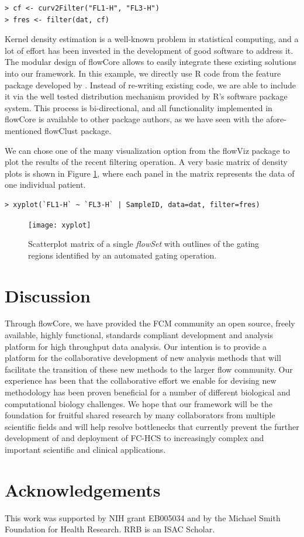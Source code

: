 \documentclass[12pt]{article}
\newcommand{\Rpackage}[1]{{\textsf{#1}}}
\newcommand{\Rclass}[1]{{\textit{#1}}}
\begin{document}
\begin{verbatim}
> cf <- curv2Filter("FL1-H", "FL3-H")
> fres <- filter(dat, cf)
\end{verbatim}

Kernel density estimation is a well-known problem in statistical
computing, and a lot of effort has been invested in the development of
good software to address it. The modular design of \Rpackage{flowCore}
allows to easily integrate these existing solutions into our
framework. In this example, we directly use R code from the
\Rpackage{feature} package developed by \cite{wand2008}. Instead of
re-writing existing code, we are able to include it via the well
tested distribution mechanism provided by R's software package
system. This process is bi-directional, and all functionality
implemented in \Rpackage{flowCore} is available to other package
authors, as we have seen with the afore-mentioned \Rpackage{flowClust}
package.

We can chose one of the many visualization option from the flowViz
package to plot the results of the recent filtering operation. A very
basic matrix of density plots is shown in Figure \ref{xyplot}, where
each panel in the matrix represents the data of one individual
patient.

\begin{verbatim}
> xyplot(`FL1-H` ~ `FL3-H` | SampleID, data=dat, filter=fres)
\end{verbatim}


\begin{figure}[htbp]
\centering
\texttt{[image: xyplot]}
\caption{\label{xyplot}%
  Scatterplot matrix of a single \Rclass{flowSet} with outlines of the
  gating regions identified by an automated gating operation.}
\end{figure}



\section*{Discussion}

Through \Rpackage{flowCore}, we have provided the FCM community an open source,
freely available, highly functional, standards compliant development
and analysis platform for high throughput data analysis.  Our
intention is to provide a platform for the collaborative development
of new analysis methods that will facilitate the transition of these
new methods to the larger flow community.  Our experience has been
that the collaborative effort we enable for devising new methodology
has been proven beneficial for a number of different biological and
computational biology challenges.  We hope that our framework will be
the foundation for fruitful shared research by many collaborators from
multiple scientific fields and will help resolve bottlenecks that
currently prevent the further development of and deployment of FC-HCS
to increasingly complex and important scientific and clinical
applications.

\section*{Acknowledgements}
This work was supported by NIH grant EB005034 and by the Michael Smith
Foundation for Health Research. RRB is an ISAC Scholar.

  
 
\end{document}
